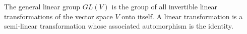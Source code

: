 The general linear group $GL(V)$ is the group of all invertible linear transformations of the vector space $V$ onto itself. A linear transformation is a semi-linear transformation whose associated automorphism is the identity.
